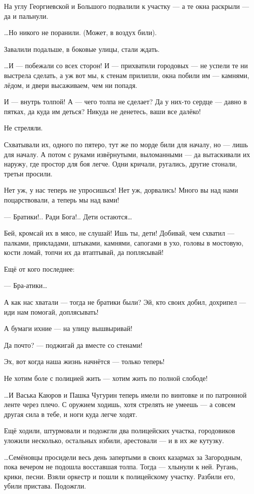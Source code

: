 На углу Георгиевской и Большого подвалили к участку — а те окна раскрыли — да и пальнули.

…Но никого не поранили. (Может, в воздух били).

Завалили подальше, в боковые улицы, стали ждать.

…И — побежали со всех сторон! И — прихватили городовых — не успели те ни
выстрела сделать, а уж вот мы, к стенам прилипли, окна побили им — камнями,
лёдом, и двери высаживаем, чем ни попадя.

И — внутрь толпой! А — чего толпа не сделает? Да у них-то сердце — давно в
пятках, да куда им деться? Никуда не денетесь, ваши все далёко!

Не стреляли.

Схватывали их, одного по пятеро, тут же по морде били для началу, но — лишь для
началу. А потом с руками извёрнутыми, выломанными — да вытаскивали их наружу,
где простор для боя легче. Одни кричали, ругались, другие стонали, третьи
просили.

Нет уж, у нас теперь не упросишься! Нет уж, дорвались! Много вы над нами поцарствовали, а теперь мы над вами!

— Братики!.. Ради Бога!.. Дети остаются…

Бей, кромсай их в мясо, не слушай! Ишь ты, дети! Добивай, чем схватил —
палками, прикладами, штыками, камнями, сапогами в ухо, головы в мостовую, кости
ломай, топчи их да втаптывай, да поплясывай!

Ещё от кого последнее:

— Бра-атики…

А как нас хватали — тогда не братики были? Эй, кто своих добил, дохрипел — иди нам помогай, доплясывать!

А бумаги ихние — на улицу вышвыривай!

Да почто? — поджигай да вместе со стенами!

Эх, вот когда наша жизнь начнётся — только теперь!

Не хотим боле с полицией жить — хотим жить по полной слободе!

…И Васька Каюров и Пашка Чугурин теперь имели по винтовке и по патронной ленте
через плечо. С оружием ходишь, хотя стрелять не умеешь — а совсем другая сила в
тебе, и ноги куда легче ходят.

Ещё ходили, штурмовали и подожгли два полицейских участка, городовиков уложили
несколько, остальных избили, арестовали — и в их же кутузку.

…Семёновцы просидели весь день запертыми в своих казармах за Загородным, пока
вечером не подошла восставшая толпа. Тогда — хлынули к ней. Ругань, крики,
песни. Взяли оркестр и пошли к полицейскому участку. Разбили его, убили
пристава. Подожгли.

